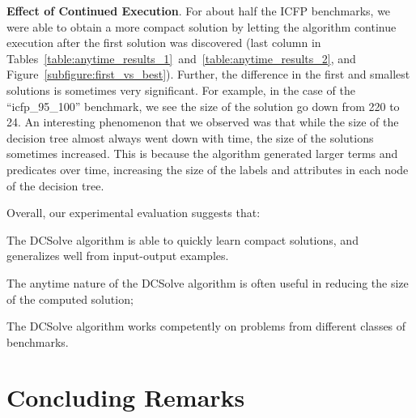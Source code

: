 \documentclass{llncs}
\newcommand{\dcsolve}{{\sffamily\fontsize{8.5}{10}\selectfont
    DCSolve}\xspace}
\renewcommand{\paragraph}[1]{\par\noindent\textbf{#1}.}
\begin{document}
\paragraph{Effect of Continued Execution}
For about half the ICFP benchmarks, we were able to obtain a more
compact solution by letting the algorithm continue execution after the
first solution was discovered (last column in
Tables~\ref{table:anytime_results_1}~and~\ref{table:anytime_results_2},
and Figure~\ref{subfigure:first_vs_best}).
Further, the difference in the first and
smallest solutions is sometimes very significant. For example, in the
case of the ``icfp\_95\_100'' benchmark, we see the size of the
solution go down from 220 to 24.
An interesting phenomenon that we observed was that while the size of
the decision tree almost always went down with time, the size of the
solutions sometimes increased.
This is because the algorithm generated larger terms and predicates
over time, increasing the size of the labels and attributes in each node
of the decision tree.


Overall, our experimental evaluation suggests that:
\begin{inparaenum}[(a)]
\item
The \dcsolve algorithm is able to quickly learn compact solutions,
and generalizes well from input-output examples.
\item
The anytime nature of the \dcsolve algorithm is often useful in
reducing the size of the computed solution;
\item
The \dcsolve algorithm works competently on problems from different
classes of benchmarks.
\end{inparaenum}

\section{Concluding Remarks}
\label{sec:conclusion}
\end{document}
